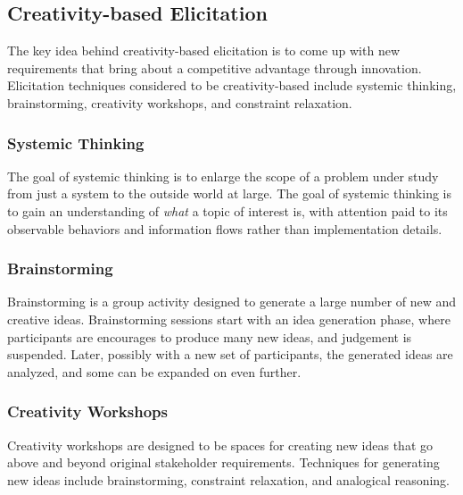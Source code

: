 \documentclass[12pt,titlepage]{article}
\begin{document}
    \subsection{Creativity-based Elicitation}
      The key idea behind creativity-based elicitation is to come up with new requirements that bring about a competitive advantage through innovation. Elicitation techniques
      considered to be creativity-based include systemic thinking, brainstorming, creativity workshops, and constraint relaxation.

      \subsubsection{Systemic Thinking}
        The goal of systemic thinking is to enlarge the scope of a problem under study from just a system to the outside world at large. The goal of systemic thinking is to
        gain an understanding of \textit{what} a topic of interest is, with attention paid to its observable behaviors and information flows rather than implementation
        details.

      \subsubsection{Brainstorming}
        Brainstorming is a group activity designed to generate a large number of new and creative ideas. Brainstorming sessions start with an idea generation phase, where
        participants are encourages to produce many new ideas, and judgement is suspended. Later, possibly with a new set of participants, the generated ideas are analyzed,
        and some can be expanded on even further.

      \subsubsection{Creativity Workshops}
        Creativity workshops are designed to be spaces for creating new ideas that go above and beyond original stakeholder requirements. Techniques for generating new ideas
        include brainstorming, constraint relaxation, and analogical reasoning.
\end{document}
